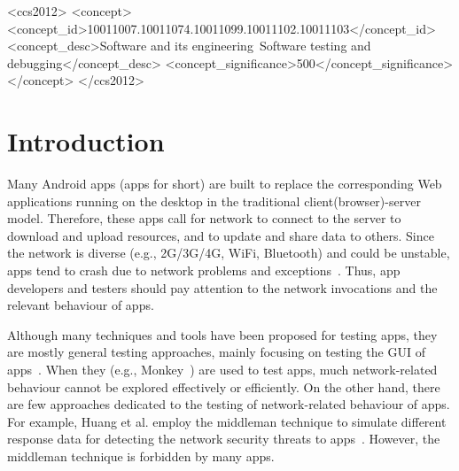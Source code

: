 \documentclass[sigconf,review, anonymous]{acmart}
\begin{document}
%
%
\begin{CCSXML}
<ccs2012>
<concept>
<concept_id>10011007.10011074.10011099.10011102.10011103</concept_id>
<concept_desc>Software and its engineering~Software testing and debugging</concept_desc>
<concept_significance>500</concept_significance>
</concept>
</ccs2012>
\end{CCSXML}





\maketitle

\section{Introduction}
Many Android apps (apps for short) are built to replace the corresponding Web applications running on the desktop in the traditional client(browser)-server model. Therefore, these apps call for network to connect to the server to download and upload resources, and to update and share data to others.  Since the network is diverse (e.g., 2G/3G/4G, WiFi,  Bluetooth) and could be unstable, apps tend to crash due to network problems and exceptions~\cite{LBZKLLTSCZ14,XiongCZXQ18,HuangZJLL19}. Thus, app developers and testers should pay attention to the network invocations and the relevant behaviour of apps.

Although many techniques and tools have been proposed for testing apps, they are mostly general testing approaches, mainly focusing on testing the GUI of apps~\cite{ChoudharyGO15,WangLYCZDX18}. When they (e.g., \textsf{Monkey}~\cite{monkey}) are used to test apps, much network-related behaviour cannot be explored effectively or efficiently. On the other hand, there are few approaches dedicated to the testing of network-related behaviour of apps. For example, Huang et al. employ the middleman technique to simulate different response data for detecting the network security threats to apps~\cite{HuangZJLL19}. However, the middleman technique is forbidden by many apps.  
\end{document}

